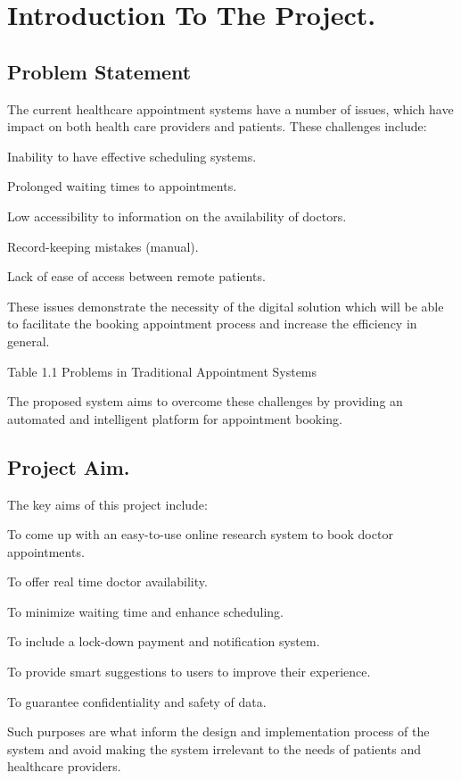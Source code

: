 \chapter{Introduction To The Project.}

\section{Problem Statement}

The current healthcare appointment systems have a number of issues, which have impact on both health care providers and patients. These challenges include:

Inability to have effective scheduling systems.

Prolonged waiting times to appointments.

Low accessibility to information on the availability of doctors.

Record-keeping mistakes (manual).

Lack of ease of access between remote patients.

These issues demonstrate the necessity of the digital solution which will be able to facilitate the booking appointment process and increase the efficiency in general.

Table 1.1 Problems in Traditional Appointment Systems

The proposed system aims to overcome these challenges by providing an automated and intelligent platform for appointment booking.

\section{Project Aim.}

The key aims of this project include:

To come up with an easy-to-use online research system to book doctor appointments.

To offer real time doctor availability.

To minimize waiting time and enhance scheduling.

To include a lock-down payment and notification system.

To provide smart suggestions to users to improve their experience.

To guarantee confidentiality and safety of data.

Such purposes are what inform the design and implementation process of the system and avoid making the system irrelevant to the needs of patients and healthcare providers.

